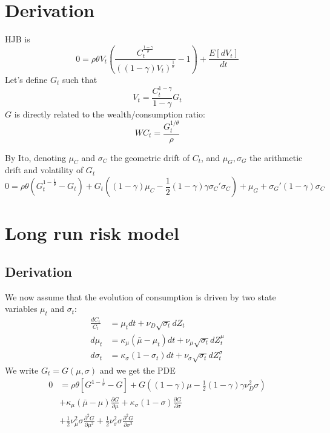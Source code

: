\documentclass[english]{article}
\begin{document}
\section{Derivation}
HJB is
$$0 = \rho \theta V_t(\frac{C_t^{\frac{1-\gamma}{\theta}}}{((1-\gamma)V_t)^{\frac{1}{\theta}}}-1) + \frac{E[dV_t]}{dt}$$
Let's define $G_t$ such that
$$V_t = \frac{C_t^{1-\gamma}}{1-\gamma} G_t$$
$G$ is directly related to the wealth/consumption ratio:
$$WC_{t} = \frac{G_t^{1/\theta}}{\rho}$$

By Ito, denoting $\mu_{C}$ and $\sigma_{C}$ the geometric drift of $C_t$, and $\mu_G, \sigma_G$ the arithmetic drift and volatility of $G_t$
$$0 = \rho \theta (G_t^{1-\frac{1}{\theta}}-G_t)  + G_t ((1-\gamma) \mu_{C} - \frac{1}{2}(1-\gamma)\gamma\sigma_{C}'\sigma_{C}) +  \mu_G + \sigma_G'(1-\gamma)\sigma_{C}$$


\section{Long run risk model}

\subsection{Derivation}
We now assume that the evolution of consumption is driven by two state variables $\mu_{t}$ and $\sigma_{t}$:
\begin{align*}
	\frac{dC_{t}}{C_{t}} & =  \mu_{t}dt+\nu_{D}\sqrt{\sigma_{t}}dZ_{t}\\
	d\mu_{t} & =  \kappa_{\mu}(\bar{\mu}-\mu_{t})dt+\nu_{\mu}\sqrt{\sigma_{t}}dZ_{t}^{\mu}\\
	d\sigma_{t} & =  \kappa_{\sigma}(1-\sigma_{t})dt+\nu_{\sigma}\sqrt{\sigma_{t}}dZ_{t}^{\sigma}
\end{align*}
We write $G_t = G(\mu, \sigma)$ and we get the PDE
\begin{align*}
	0&= \rho \theta[G^{1-\frac{1}{\theta}}- G]+G((1-\gamma)\mu-\frac{1}{2}(1-\gamma)\gamma\nu_D^2\sigma)\\
	&+ \kappa_{\mu}(\bar{\mu}-\mu)\frac{\partial G}{\partial\mu}+  \kappa_{\sigma}(1-\sigma)\frac{\partial G}{\partial\sigma}\\
	&+\frac{1}{2}\nu_{\mu}^{2}\sigma\frac{\partial^{2}G}{\partial\mu^{2}}+\frac{1}{2}\nu_{\sigma}^{2}\sigma \frac{\partial^{2}G}{\partial\sigma^{2}}
\end{align*}
\end{document}
